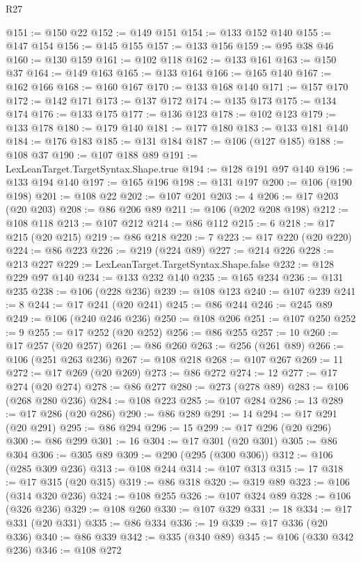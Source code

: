 \begin{lexlean}{R27}
\begin{coremodule}
@151 := @150 @22
@152 := @149 @151
@154 := @133 @152 @140
@155 := @147 @154
@156 := @145 @155
@157 := @133 @156
@159 := @95 @38 @46
@160 := @130 @159
@161 := @102 @118
@162 := @133 @161
@163 := @150 @37
@164 := @149 @163
@165 := @133 @164
@166 := @165 @140
@167 := @162 @166
@168 := @160 @167
@170 := @133 @168 @140
@171 := @157 @170
@172 := @142 @171
@173 := @137 @172
@174 := @135 @173
@175 := @134 @174
@176 := @133 @175
@177 := @136 @123
@178 := @102 @123
@179 := @133 @178
@180 := @179 @140
@181 := @177 @180
@183 := @133 @181 @140
@184 := @176 @183
@185 := @131 @184
@187 := @106 (@127 @185)
@188 := @108 @37
@190 := @107 @188 @89
@191 := LexLeanTarget.TargetSyntax.Shape.true
@194 := @128 @191 @97 @140
@196 := @133 @194 @140
@197 := @165 @196
@198 := @131 @197
@200 := @106 (@190 @198)
@201 := @108 @22
@202 := @107 @201
@203 := 4
@206 := @17 @203 (@20 @203)
@208 := @86 @206 @89
@211 := @106 (@202 @208 @198)
@212 := @108 @118
@213 := @107 @212
@214 := @86 @112
@215 := 6
@218 := @17 @215 (@20 @215)
@219 := @86 @218
@220 := 7
@223 := @17 @220 (@20 @220)
@224 := @86 @223
@226 := @219 (@224 @89)
@227 := @214 @226
@228 := @213 @227
@229 := LexLeanTarget.TargetSyntax.Shape.false
@232 := @128 @229 @97 @140
@234 := @133 @232 @140
@235 := @165 @234
@236 := @131 @235
@238 := @106 (@228 @236)
@239 := @108 @123
@240 := @107 @239
@241 := 8
@244 := @17 @241 (@20 @241)
@245 := @86 @244
@246 := @245 @89
@249 := @106 (@240 @246 @236)
@250 := @108 @206
@251 := @107 @250
@252 := 9
@255 := @17 @252 (@20 @252)
@256 := @86 @255
@257 := 10
@260 := @17 @257 (@20 @257)
@261 := @86 @260
@263 := @256 (@261 @89)
@266 := @106 (@251 @263 @236)
@267 := @108 @218
@268 := @107 @267
@269 := 11
@272 := @17 @269 (@20 @269)
@273 := @86 @272
@274 := 12
@277 := @17 @274 (@20 @274)
@278 := @86 @277
@280 := @273 (@278 @89)
@283 := @106 (@268 @280 @236)
@284 := @108 @223
@285 := @107 @284
@286 := 13
@289 := @17 @286 (@20 @286)
@290 := @86 @289
@291 := 14
@294 := @17 @291 (@20 @291)
@295 := @86 @294
@296 := 15
@299 := @17 @296 (@20 @296)
@300 := @86 @299
@301 := 16
@304 := @17 @301 (@20 @301)
@305 := @86 @304
@306 := @305 @89
@309 := @290 (@295 (@300 @306))
@312 := @106 (@285 @309 @236)
@313 := @108 @244
@314 := @107 @313
@315 := 17
@318 := @17 @315 (@20 @315)
@319 := @86 @318
@320 := @319 @89
@323 := @106 (@314 @320 @236)
@324 := @108 @255
@326 := @107 @324 @89
@328 := @106 (@326 @236)
@329 := @108 @260
@330 := @107 @329
@331 := 18
@334 := @17 @331 (@20 @331)
@335 := @86 @334
@336 := 19
@339 := @17 @336 (@20 @336)
@340 := @86 @339
@342 := @335 (@340 @89)
@345 := @106 (@330 @342 @236)
@346 := @108 @272

\end{coremodule}
\end{lexlean}
